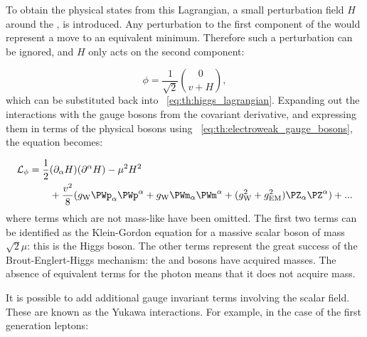 To obtain the physical states from this Lagrangian, a small perturbation field $H$ around the \VEV, is introduced. Any perturbation to the first component of the \VEV would represent a move to an equivalent minimum. Therefore such a perturbation can be ignored, and $H$ only acts on the second component:

\begin{equation}
\label{eq:th:higgs_vev_perturbation}
\phi = \frac{1}{\sqrt{2}} \binom{0}{v+H} ,
\end{equation}
which can be substituted back into \Eq~\ref{eq:th:higgs_lagrangian}. Expanding out the interactions with the gauge bosons from the covariant derivative, and expressing them in terms of the physical bosons using \Eq~\ref{eq:th:electroweak_gauge_bosons}, the equation becomes:

\begin{equation}
\begin{split}
  \mathcal{L}_{\phi}  =  \frac{1}{2} & (\partial_{\alpha} H) (\partial^{\alpha} H) -  \mu^{2} H^2 \\
&  + \frac{v^2}{8}( g_{\textrm{W}} \PWp_{\alpha}\PWp^{\alpha} + g_{\textrm{W}} \PWm_{\alpha}\PWm^{\alpha} + (g^2_{\textrm{W}}+g^2_{\textrm{EM}}) \PZ_{\alpha}\PZ^{\alpha}) + ... \\
\end{split}
\end{equation}
\label{eq:th:higgs_lagrangian}
where terms which are not mass-like have been omitted.
The first two terms can be identified as the Klein-Gordon equation for a massive scalar boson of mass $\sqrt{2}\mu$: this is the Higgs boson. The other terms represent the great success of the Brout-Englert-Higgs mechanism: the \PWpm and \PZ bosons have acquired masses. The absence of equivalent terms for the photon means that it does not acquire mass.

It is possible to add additional gauge invariant terms involving the scalar field. These are known as the Yukawa interactions. For example, in the case of the first generation leptons:

